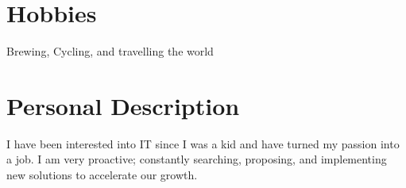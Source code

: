 \documentclass[]{template/friggeri-cv} %
\begin{document}

\section{Hobbies}

{Brewing, Cycling, and travelling the world}

\section{Personal Description}
        {
          I have been interested into IT since I was a kid and have turned my passion into a job.
          I am very proactive; constantly searching, proposing, and implementing new solutions to accelerate our growth.
        }
\end{document}
